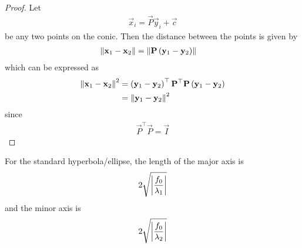\documentclass[journal,12pt,onecolumn]{IEEEtran}
\begin{document}
	\begin{proof}
	Let 
\begin{align}
\vec{x}_i = \vec{P}\vec{y}_i+\vec{c} 
\label{eq:conic_affine_pts}
\end{align}
be any two points on the conic.  Then the distance between the points is given by 
\begin{align}
	\left\lVert\mathbf{x}_1-\mathbf{x}_2 \right\rVert &= \left\lVert\mathbf{P}\left(	\mathbf{y}_1 -\mathbf{y}_2 \right)\right\rVert
\end{align}
which can be expressed as 
\begin{align}
	\left\lVert\mathbf{x}_1-\mathbf{x}_2 \right\rVert^2 &= 		\left(\mathbf{y}_1 -\mathbf{y}_2 \right)^{\top}\mathbf{P}^{\top}\mathbf{P}\left(\mathbf{y}_1 -\mathbf{y}_2 \right)
	\\
	&= 		\left\lVert\mathbf{y}_1 -\mathbf{y}_2 \right\rVert^2
\label{eq:conic_affine_norm_preserve}
\end{align}
since 
\begin{align}
	\vec{P}^{\top}\vec{P} = \vec{I}
\end{align}
	\end{proof}
    \begin{corollary} For the standard hyperbola/ellipse, the length of the major axis is 
  \begin{align}
\label{eq:chord-len-major}
 2\sqrt{\left\vert\frac{
f_0}
{\lambda_1}
	  \right\vert}
  \end{align}
  and the minor axis is 
  \begin{align}
\label{eq:chord-len-minor}
 2\sqrt{\left\vert\frac{
f_0}
{\lambda_2}
	  \right\vert}
  \end{align}
\end{corollary}
\end{document}
